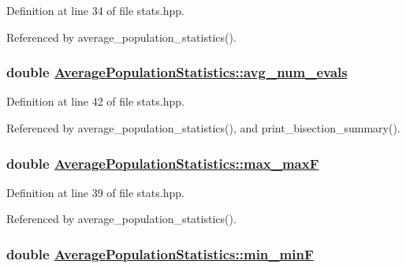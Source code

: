 Definition at line 34 of file stats.hpp.

Referenced by average\_\-population\_\-statistics().\hypertarget{struct_average_population_statistics_858bca094b4aa5b003a73674a5fbd805}{
\subsubsection[avg\_\-num\_\-evals]{\setlength{\rightskip}{0pt plus 5cm}double \hyperlink{struct_average_population_statistics_858bca094b4aa5b003a73674a5fbd805}{Average\-Population\-Statistics::avg\_\-num\_\-evals}}}
\label{struct_average_population_statistics_858bca094b4aa5b003a73674a5fbd805}




Definition at line 42 of file stats.hpp.

Referenced by average\_\-population\_\-statistics(), and print\_\-bisection\_\-summary().\hypertarget{struct_average_population_statistics_cce6ed392d71b6ab68af1178f7185b89}{
\subsubsection[max\_\-maxF]{\setlength{\rightskip}{0pt plus 5cm}double \hyperlink{struct_average_population_statistics_cce6ed392d71b6ab68af1178f7185b89}{Average\-Population\-Statistics::max\_\-max\-F}}}
\label{struct_average_population_statistics_cce6ed392d71b6ab68af1178f7185b89}




Definition at line 39 of file stats.hpp.

Referenced by average\_\-population\_\-statistics().\hypertarget{struct_average_population_statistics_9e747b4448fa835def23ea219f1dc334}{
\subsubsection[min\_\-minF]{\setlength{\rightskip}{0pt plus 5cm}double \hyperlink{struct_average_population_statistics_9e747b4448fa835def23ea219f1dc334}{Average\-Population\-Statistics::min\_\-min\-F}}}
\label{struct_average_population_statistics_9e747b4448fa835def23ea219f1dc334}




